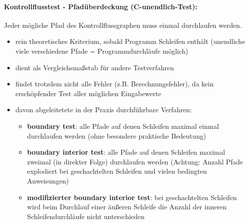 \paragraph{Kontrollflusstest - Pfadüberdeckung (C-unendlich-Test):}
Jeder mögliche Pfad des Kontrollflussgraphen muss einmal durchlaufen werden.
\begin{itemize}
	\item rein theoretisches Kriterium, sobald Programm Schleifen enthält (unendliche viele verschiedene Pfade = Programmdurchläufe möglich)
	\item dient als Vergleichsmaßstab für andere Testverfahren
	\item findet trotzdem nicht alle Fehler (z.B. Berechnungsfehler), da kein erschöpfender Test aller möglichen Eingabewerte
	\item davon abgeleitetete in der Praxis durchführbare Verfahren:
	\begin{itemize}
		\item \textbf{boundary test}: alle Pfade auf denen Schleifen maximal einmal durchlaufen werden (ohne besondere praktische Bedeutung)
		\item \textbf{boundary interior test}: alle Pfade auf denen Schleifen maximal zweimal (in direkter Folge) durchlaufen werden (Achtung: Anzahl Pfade explodiert bei geschachtelten Schleifen und vielen bedingten Anweisungen)
		\item \textbf{modifizierter boundary interior test}: bei geschachtelten Schleifen wird beim Durchlauf einer äußeren Schleife die Anzahl der inneren Schleifendurchläufe nicht unterschieden
	\end{itemize}
\end{itemize}

